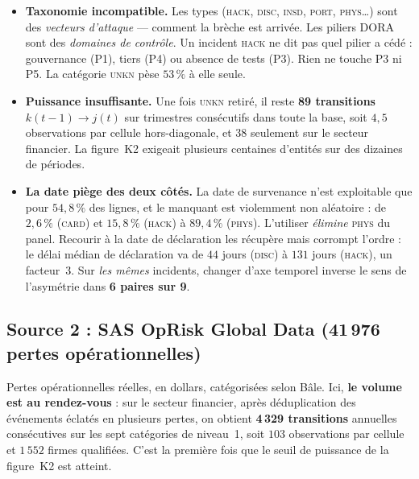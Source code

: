 \documentclass[11pt,a4paper]{article}
\begin{document}
\begin{itemize}[leftmargin=1.4em,itemsep=2pt]
\item \textbf{Taxonomie incompatible.} Les types (\textsc{hack}, \textsc{disc},
  \textsc{insd}, \textsc{port}, \textsc{phys}\dots) sont des \emph{vecteurs d'attaque}
  --- comment la brèche est arrivée. Les piliers DORA sont des \emph{domaines de contrôle}.
  Un incident \textsc{hack} ne dit pas quel pilier a cédé : gouvernance (P1), tiers (P4) ou
  absence de tests (P3). Rien ne touche P3 ni P5. La catégorie \textsc{unkn} pèse
  $53\,\%$ à elle seule.
\item \textbf{Puissance insuffisante.} Une fois \textsc{unkn} retiré, il reste
  \textbf{89 transitions} $k(t\!-\!1)\to j(t)$ sur trimestres consécutifs dans toute la base,
  soit $4{,}5$ observations par cellule hors-diagonale, et $38$ seulement sur le secteur
  financier. La figure~K2 exigeait plusieurs centaines d'entités sur des dizaines de périodes.
\item \textbf{La date piège des deux côtés.} La date de survenance n'est exploitable que pour
  $54{,}8\,\%$ des lignes, et le manquant est violemment non aléatoire : de $2{,}6\,\%$
  (\textsc{card}) et $15{,}8\,\%$ (\textsc{hack}) à $89{,}4\,\%$ (\textsc{phys}). L'utiliser
  \emph{élimine} \textsc{phys} du panel. Recourir à la date de déclaration les récupère mais
  corrompt l'ordre : le délai médian de déclaration va de $44$ jours (\textsc{disc}) à $131$
  jours (\textsc{hack}), un facteur~$3$. Sur \emph{les mêmes} incidents, changer d'axe
  temporel inverse le sens de l'asymétrie dans \textbf{6 paires sur 9}.
\end{itemize}

\subsection*{Source 2 : SAS OpRisk Global Data (41\,976 pertes opérationnelles)}

Pertes opérationnelles réelles, en dollars, catégorisées selon Bâle. Ici, \textbf{le volume
est au rendez-vous} : sur le secteur financier, après déduplication des événements éclatés en
plusieurs pertes, on obtient \textbf{4\,329 transitions} annuelles consécutives sur les sept
catégories de niveau~1, soit $103$ observations par cellule et $1\,552$ firmes qualifiées.
C'est la première fois que le seuil de puissance de la figure~K2 est atteint.
\end{document}
